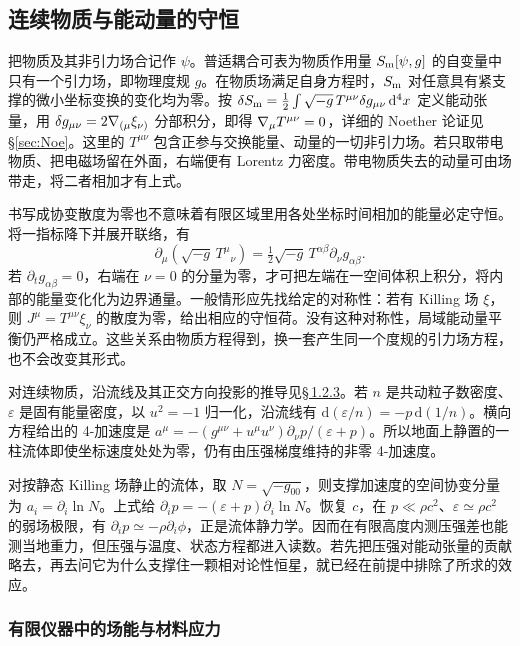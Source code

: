 \subsection{连续物质与能动量的守恒}

把物质及其非引力场合记作 $\psi$。普适耦合可表为物质作用量 $S_{\rm m}[\psi,g]$ 的自变量中只有一个引力场，即物理度规 $g$。在物质场满足自身方程时，$S_{\rm m}$ 对任意具有紧支撑的微小坐标变换的变化均为零。按 $\delta S_{\rm m}=\tfrac12\int\sqrt{-g}\,T^{\mu\nu}\delta g_{\mu\nu}\,\dd^4x$ 定义能动张量，用 $\delta g_{\mu\nu}=2\nabla_{(\mu}\xi_{\nu)}$ 分部积分，即得 $\nabla_\mu T^{\mu\nu}=0$，详细的 Noether 论证见 \S\ref{sec:Noe}。这里的 $T^{\mu\nu}$ 包含正参与交换能量、动量的一切非引力场。若只取带电物质、把电磁场留在外面，右端便有 Lorentz 力密度。带电物质失去的动量可由场带走，将二者相加才有上式。

书写成协变散度为零也不意味着有限区域里用各处坐标时间相加的能量必定守恒。将一指标降下并展开联络，有
\[
   \partial_\mu(\sqrt{-g}\,T^\mu{}_{\nu})
       =\tfrac12\sqrt{-g}\,T^{\alpha\beta}\partial_\nu g_{\alpha\beta}.
\]
若 $\partial_t g_{\alpha\beta}=0$，右端在 $\nu=0$ 的分量为零，才可把左端在一空间体积上积分，将内部的能量变化化为边界通量。一般情形应先找给定的对称性：若有 Killing 场 $\xi$，则 $J^\mu=T^{\mu\nu}\xi_\nu$ 的散度为零，给出相应的守恒荷。没有这种对称性，局域能动量平衡仍严格成立。这些关系由物质方程得到，换一套产生同一个度规的引力场方程，也不会改变其形式。

对连续物质，沿流线及其正交方向投影的推导见\hyperlink{subsection.1.2.3}{\S\,1.2.3}。若 $n$ 是共动粒子数密度、$\varepsilon$ 是固有能量密度，以 $u^2=-1$ 归一化，沿流线有 $\mathrm d(\varepsilon/n)=-p\,\mathrm d(1/n)$。横向方程给出的 4-加速度是 $a^\mu=-(g^{\mu\nu}+u^\mu u^\nu)\partial_\nu p/(\varepsilon+p)$。所以地面上静置的一柱流体即使坐标速度处处为零，仍有由压强梯度维持的非零 4-加速度。

对按静态 Killing 场静止的流体，取 $N=\sqrt{-g_{00}}$，则支撑加速度的空间协变分量为 $a_i=\partial_i\ln N$。上式给 $\partial_ip=-(\varepsilon+p)\partial_i\ln N$。恢复 $c$，在 $p\ll\rho c^2$、$\varepsilon\simeq\rho c^2$ 的弱场极限，有 $\partial_i p\simeq-\rho\partial_i\phi$，正是流体静力学。因而在有限高度内测压强差也能测当地重力，但压强与温度、状态方程都进入读数。若先把压强对能动张量的贡献略去，再去问它为什么支撑住一颗相对论性恒星，就已经在前提中排除了所求的效应。

\subsubsection{有限仪器中的场能与材料应力}

